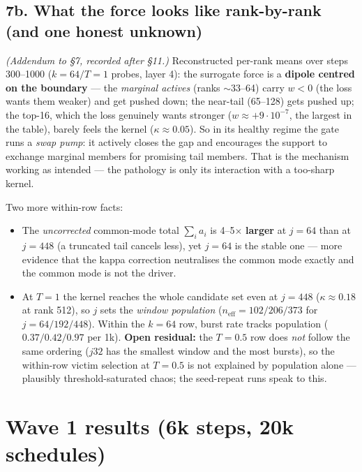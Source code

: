 \documentclass[11pt,a4paper]{article}
\newcommand{\neff}{n_{\mathrm{eff}}}
\begin{document}
\subsection*{7b. What the force looks like rank-by-rank (and one honest
unknown)}

\emph{(Addendum to \S7, recorded after \S11.)} Reconstructed per-rank means
over steps 300--1000 ($k{=}64/T{=}1$ probes, layer 4): the surrogate force is
a \textbf{dipole centred on the boundary} --- the \emph{marginal actives}
(ranks ${\sim}33$--64) carry $w < 0$ (the loss wants them weaker) and get
pushed down; the near-tail (65--128) gets pushed up; the top-16, which the
loss genuinely wants stronger ($w \approx +9\cdot10^{-7}$, the largest in the
table), barely feels the kernel ($\kappa \approx 0.05$). So in its healthy
regime the gate runs a \emph{swap pump}: it actively closes the gap and
encourages the support to exchange marginal members for promising tail
members. That is the mechanism working as intended --- the pathology is only
its interaction with a too-sharp kernel.

Two more within-row facts:
\begin{itemize}[leftmargin=1.4em]
\item The \emph{uncorrected} common-mode total $\sum_i a_i$ is
  4--5$\times$ \textbf{larger} at $j{=}64$ than at $j{=}448$ (a truncated tail
  cancels less), yet $j{=}64$ is the stable one --- more evidence that the
  kappa correction neutralises the common mode exactly and the common mode is
  not the driver.
\item At $T{=}1$ the kernel reaches the whole candidate set even at $j{=}448$
  ($\kappa \approx 0.18$ at rank 512), so $j$ sets the \emph{window
  population} ($\neff = 102/206/373$ for $j = 64/192/448$). Within the
  $k{=}64$ row, burst rate tracks population ($0.37/0.42/0.97$ per 1k).
  \textbf{Open residual:} the $T{=}0.5$ row does \emph{not} follow the same
  ordering ($j32$ has the smallest window and the most bursts), so the
  within-row victim selection at $T{=}0.5$ is not explained by population
  alone --- plausibly threshold-saturated chaos; the seed-repeat runs speak to
  this.
\end{itemize}

\section{Wave 1 results (6k steps, 20k schedules)}
\end{document}
